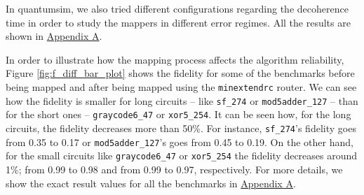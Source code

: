 In quantumsim, we also tried different configurations regarding the decoherence time in order to study the mappers in different error regimes. 
All the results are shown in \href{appendix-1.org}{Appendix A}.


In order to illustrate how the mapping process affects the algorithm reliability, Figure \ref{fig:f_diff_bar_plot} shows the fidelity for some of the benchmarks before being mapped and after being mapped using the \texttt{minextendrc} router.
We can see how the fidelity is smaller for long circuits -- like \texttt{sf\_274} or \texttt{mod5adder\_127} -- than for the short ones -- \texttt{graycode6\_47} or \texttt{xor5\_254}.
It can be seen how, for the long circuits, the fidelity decreases more than 50\%.
For instance, \texttt{sf\_274}'s fidelity goes from 0.35 to 0.17 or \texttt{mod5adder\_127}'s goes from 0.45 to 0.19.
On the other hand, for the small circuits like \texttt{graycode6\_47} or \texttt{xor5\_254} the fidelity decreases around 1\%; from 0.99 to 0.98 and from 0.99 to 0.97, respectively.
For more details, we show the exact result values for all the benchmarks in \href{appendix-1.org}{Appendix A}.

